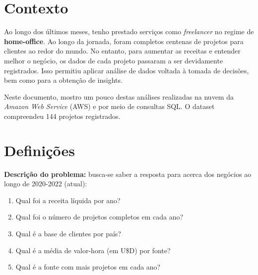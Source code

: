 \documentclass{queriessql}
\begin{document}
\printtitle

\section{Contexto}

    Ao longo dos últimos meses, tenho prestado serviços como \textit{freelancer} no regime de \textbf{home-office}. Ao longo da jornada, foram completos centenas de projetos para clientes ao redor do mundo. No entanto, para aumentar as receitas e entender melhor o negócio, os dados de cada projeto passaram a ser devidamente registrados. Isso permitiu aplicar análise de dados voltada à tomada de decisões, bem como para a obtenção de insights.
    
    Neste documento, mostro um pouco destas análises realizadas na nuvem da \textit{Amazon Web Service} (AWS) e por meio de consultas SQL. O dataset compreendeu 144 projetos registrados. %


\section{Definições}
\begin{caixa}
    \textbf{Descrição do problema:} busca-se saber a resposta para  acerca dos negócios  ao longo de 2020-2022 (atual):
    \begin{enumerate}
            \item Qual foi a receita líquida por ano?
            \item Qual foi o número de projetos completos em cada ano?
            \item Qual é a base de clientes por país?
            \item Qual é a média de valor-hora (em U\$D) por fonte?
            \item Qual é a fonte com mais projetos em cada ano?
    \end{enumerate}
\end{caixa}
\end{document}
